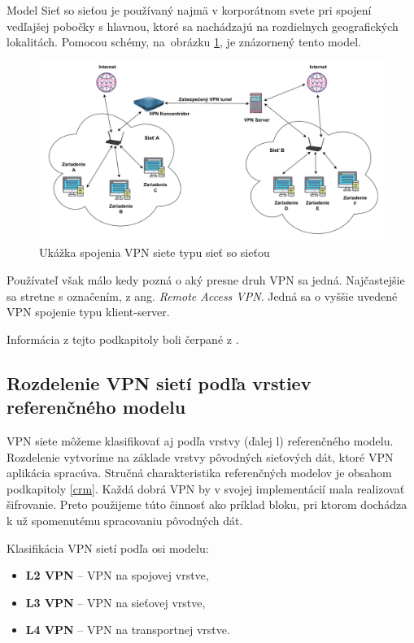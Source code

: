 Model Sieť so sieťou je používaný najmä v korporátnom svete pri spojení vedľajšej pobočky s hlavnou, ktoré sa nachádzajú na rozdielnych geografických lokalitách. Pomocou schémy, na~obrázku \ref{sts}, je znázornený tento model. 

 \begin{figure}[!ht]
 	\centering
 	\includegraphics[width=1.1\textwidth]{figures/sts}
 	\caption{Ukážka spojenia VPN siete typu sieť so sieťou}
 	\label{sts}
 \end{figure}  
Používateľ však málo kedy pozná o aký presne druh VPN sa jedná. Najčastejšie sa stretne s označením, z ang. \textit{Remote Access VPN}. Jedná sa o vyššie uvedené VPN spojenie typu klient-server.

Informácia z tejto podkapitoly boli čerpané z \cite{vpntech}.  
\subsection{Rozdelenie VPN sietí podľa vrstiev referenčného modelu}\label{rm}
VPN siete môžeme klasifikovať aj podľa vrstvy (ďalej \acrshort{l}) referenčného modelu. Rozdelenie vytvoríme na základe vrstvy pôvodných sieťových dát, ktoré VPN aplikácia spracúva. Stručná charakteristika referenčných modelov je obsahom podkapitoly \ref{crm}. Každá dobrá VPN by v svojej implementácií mala realizovať šifrovanie. Preto použijeme túto činnosť ako príklad bloku, pri ktorom dochádza k už spomenutému spracovaniu pôvodných dát. 

Klasifikácia VPN sietí podľa \acrshort{osi} modelu:
\begin{itemize}
	\item{\textbf{L2 VPN}} -- VPN na spojovej vrstve,
	\item{\textbf{L3 VPN}} -- VPN na sieťovej vrstve,
	\item{\textbf{L4 VPN}} -- VPN na transportnej vrstve.
\end{itemize}

